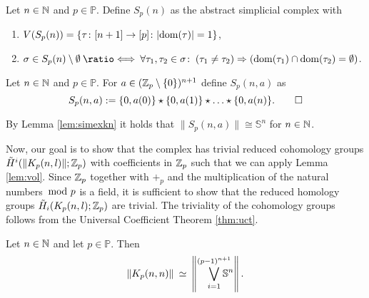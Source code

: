 \begin{defin}
  Let $n \in \mathbb{N}$ and $p \in \mathbb{P}$. Define $S_p(n)$ as the abstract simplicial complex with
  \begin{enumerate}[label=\roman*.)]
    \item $V(S_p(n)) = \{\tau\colon [n+1]\to [p]\colon |{\rm dom}(\tau)| = 1\}$,
    \item $\sigma \in S_p(n)\setminus\emptyset \: \longeq \: \forall \tau_1,\tau_2\in\sigma\colon \: (\tau_1 \neq \tau_2) \Rightarrow (\dom(\tau_1) \cap \dom(\tau_2) = \emptyset)$.\qedhere
  \end{enumerate}
\end{defin}

\begin{defin}
  Let $n \in \mathbb{N}$ and $p\in\mathbb{P}$. For $a \in (\mathbb{Z}_p\setminus\{0\})^{n+1}$ define $S_p(n,a)$ as
  \begin{equation*}
    S_p(n,a) := \{0, a(0)\} \star \{0,a(1)\} \star \ldots \star \{0,a(n)\}.\qedhere
  \end{equation*}
\end{defin}

\begin{rem}\label{rem:s}
  By Lemma \ref{lem:simexkn} it holds that $\lVert S_p(n,a) \rVert \cong \mathbb{S}^{n}$ for $n\in\mathbb{N}$.
\end{rem}

Now, our goal is to show that the complex has trivial reduced cohomology groups $\tilde{H}^i(\lVert K_p(n,l)\rVert; \mathbb{Z}_p)$ with coefficients in $\mathbb{Z}_p$ such that we can apply Lemma \ref{lem:vol}. Since $\mathbb{Z}_p$ together with $+_p$ and the multiplication of the natural numbers $\hspace*{-5px}\mod p$ is a field, it is sufficient to show that the reduced homology groups $\tilde{H}_i(K_p(n,l); \mathbb{Z}_p)$ are trivial. The triviality of the cohomology groups follows from the Universal Coefficient Theorem \ref{thm:uct}. 

\begin{lemma}
  Let $n \in \mathbb{N}$ and let $p \in \mathbb{P}$. Then
  \begin{equation*}
    \lVert K_p(n,n) \rVert \: \simeq \: \left\lVert\bigvee_{i=1}^{(p-1)^{n+1}}\hspace*{-10px}\mathbb{S}^{n}\right\rVert.
  \end{equation*}
\end{lemma}

